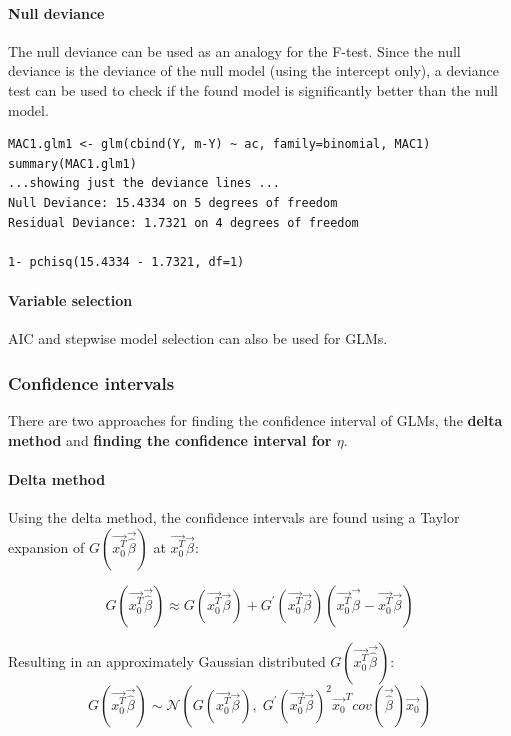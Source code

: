 \paragraph{Null deviance}
The null deviance can be used as an analogy for the F-test. Since the null deviance is the deviance of the null model (using the intercept only), a deviance test can be used to check if the found model is significantly better than the null model.

\begin{lstlisting}
MAC1.glm1 <- glm(cbind(Y, m-Y) ~ ac, family=binomial, MAC1)
summary(MAC1.glm1)
...showing just the deviance lines ...
Null Deviance: 15.4334 on 5 degrees of freedom
Residual Deviance: 1.7321 on 4 degrees of freedom

1- pchisq(15.4334 - 1.7321, df=1)
\end{lstlisting}

\paragraph{Variable selection}
AIC and stepwise model selection can also be used for GLMs.

\subsubsection{Confidence intervals}

There are two approaches for finding the confidence interval of GLMs, the \textbf{delta method} and \textbf{finding the confidence interval for $\eta$}.

\paragraph{Delta method}
Using the delta method, the confidence intervals are found using a Taylor expansion of $G(\vec{x_0^T}\vec{\hat{\beta}})$ at $\vec{x_0^T}\vec{\beta}$:

\begin{equation*}
G(\vec{x_0^T}\vec{\hat{\beta}}) \approx G(\vec{x_0^T}\vec{\beta}) + G^{'}(\vec{x_0^T}\vec{\beta}) (\vec{x_0^T}\vec{\hat{\beta}} - \vec{x_0^T}\vec{\beta})
\end{equation*}

Resulting in an approximately Gaussian distributed $G(\vec{x_0^T}\vec{\hat{\beta}})$:
\begin{equation*}
G(\vec{x_0^T}\vec{\hat{\beta}}) \sim \mathcal{N}\left (G(\vec{x_0^T}\vec{\beta}),\; G^{'}(\vec{x_0^T}\vec{\beta})^2 \vec{x_0}^T cov(\vec{\hat{\beta}})\vec{x_0}\right)
\end{equation*}

